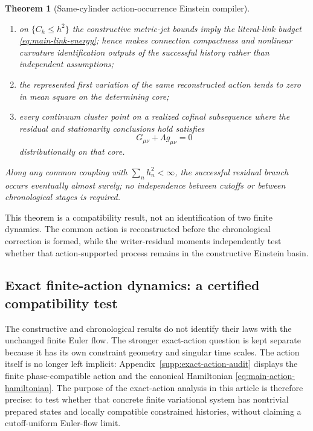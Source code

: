 \documentclass[11pt]{article}
\newtheorem{theorem}{Theorem}[section]
\numberwithin{equation}{section}
\theoremstyle{definition}
\theoremstyle{remark}
\begin{document}
\begin{theorem}[Same-cylinder action-occurrence Einstein compiler]
\begin{enumerate}[label=\textup{(\roman*)},leftmargin=2.8em]
\begin{equation}
       \qquad \Pr\{C_h>h^2\}=O(h^2);
       \label{eq:main-same-cylinder-probability}
      \end{equation}
\item on $\{C_h\le h^2\}$ the constructive metric-jet bounds imply the
      literal-link budget \eqref{eq:main-link-energy}; hence
       makes connection compactness
      and nonlinear curvature identification outputs of the successful
      history rather than independent assumptions;
\item the represented first variation of the same reconstructed action tends
      to zero in mean square on the determining core;
\item every continuum cluster point on a realized cofinal subsequence where
      the residual and stationarity conclusions hold satisfies
      \begin{equation}
       G_{\mu\nu}+\Lambda g_{\mu\nu}=0
       \label{eq:main-same-cylinder-einstein}
      \end{equation}
      distributionally on that core.
\end{enumerate}
Along any common coupling with $\sum_nh_n^2<\infty$, the successful residual
branch occurs eventually almost surely; no independence between cutoffs or
between chronological stages is required.
\end{theorem}

This theorem is a compatibility result, not an identification of two
finite dynamics.  The common action is reconstructed before the chronological
correction is formed, while the writer-residual moments independently test
whether that action-supported process remains in the constructive Einstein
basin.

\subsection{Exact finite-action dynamics: a certified compatibility test}
\label{sec:main-exact-action}

The constructive and chronological results do not identify their laws with
the unchanged finite Euler flow.  The stronger exact-action question is kept
separate because it has its own constraint geometry and singular time scales.
The action itself is no longer left implicit: Appendix~\ref{supp:exact-action-audit}
displays the finite phase-compatible action and the canonical Hamiltonian
\eqref{eq:main-action-hamiltonian}.  The purpose of the exact-action analysis
in this article is therefore precise: to test whether that concrete finite
variational system has nontrivial prepared states and locally compatible
constrained histories, without claiming a cutoff-uniform Euler-flow limit.
\end{document}
